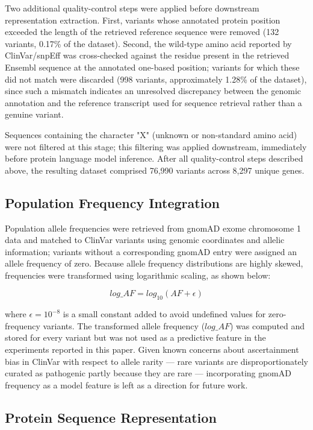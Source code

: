 \documentclass[12pt]{article}
\begin{document}
Two additional quality-control steps were applied before downstream representation extraction. First, variants whose annotated protein position exceeded the length of the retrieved reference sequence were removed (132 variants, 0.17\% of the dataset). Second, the wild-type amino acid reported by ClinVar/snpEff was cross-checked against the residue present in the retrieved Ensembl sequence at the annotated one-based position; variants for which these did not match were discarded (998 variants, approximately 1.28\% of the dataset), since such a mismatch indicates an unresolved discrepancy between the genomic annotation and the reference transcript used for sequence retrieval rather than a genuine variant.

Sequences containing the character "X" (unknown or non-standard amino acid) were not filtered at this stage; this filtering was applied downstream, immediately before protein language model inference.
After all quality-control steps described above, the resulting dataset comprised 76,990 variants across 8,297 unique genes.

\subsection{Population Frequency Integration}

Population allele frequencies were retrieved from gnomAD exome chromosome 1 data and matched to ClinVar variants using genomic coordinates and allelic information; variants without a corresponding gnomAD entry were assigned an allele frequency of zero. Because allele frequency distributions are highly skewed, frequencies were transformed using logarithmic scaling, as shown below:

\begin{equation}
    log\_AF = log_{10}(AF + \epsilon)
\end{equation}

where $\epsilon = 10^{-8}$ is a small constant added to avoid undefined values for zero-frequency variants. The transformed allele frequency ($log\_AF$) was computed and stored for every variant but was not used as a predictive feature in the experiments reported in this paper. Given known concerns about ascertainment bias in ClinVar with respect to allele rarity --- rare variants are disproportionately curated as pathogenic partly because they are rare --- incorporating gnomAD frequency as a model feature is left as a direction for future work.

\subsection{Protein Sequence Representation}
\label{sec:pseq}
\end{document}
